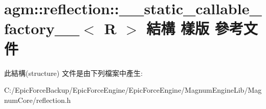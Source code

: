 \hypertarget{structagm_1_1reflection_1_1____static__callable__factory____}{}\section{agm\+:\+:reflection\+:\+:\+\_\+\+\_\+static\+\_\+callable\+\_\+factory\+\_\+\+\_\+$<$ R $>$ 結構 樣版 參考文件}
\label{structagm_1_1reflection_1_1____static__callable__factory____}


此結構(structure) 文件是由下列檔案中產生\+:\begin{DoxyCompactItemize}
\item 
C\+:/\+Epic\+Force\+Backup/\+Epic\+Force\+Engine/\+Epic\+Force\+Engine/\+Magnum\+Engine\+Lib/\+Magnum\+Core/reflection.\+h\end{DoxyCompactItemize}
